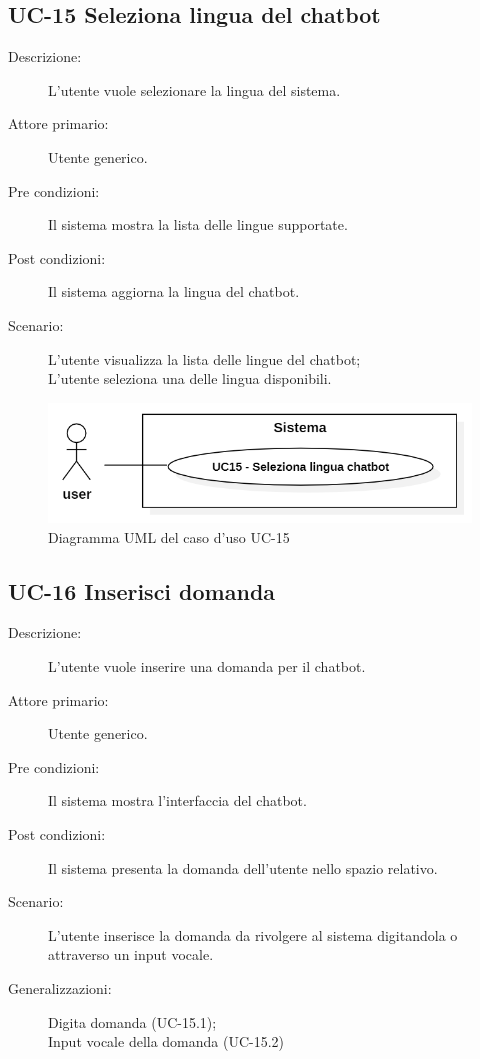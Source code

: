 \subsection{UC-15 Seleziona lingua del chatbot}
\begin{description}
    \item[Descrizione:] L'utente vuole selezionare la lingua del sistema.
    \item[Attore primario:] Utente generico.
    \item[Pre condizioni:] Il sistema mostra la lista delle lingue supportate.
    \item[Post condizioni:] Il sistema aggiorna la lingua del chatbot.
    \item[Scenario:] L'utente visualizza la lista delle lingue del chatbot;\\L'utente seleziona una delle lingua disponibili.
\end{description}

\begin{figure}[H]
    \centering
    \includegraphics[width=0.8\linewidth]{UC15.png}
    \caption{Diagramma UML del caso d'uso UC-15}
    \label{fig:UC15}
\end{figure}

\subsection{UC-16 Inserisci domanda}
\begin{description}
    \item[Descrizione:] L'utente vuole inserire una domanda per il chatbot.
    \item[Attore primario:] Utente generico.
    \item[Pre condizioni:] Il sistema mostra l'interfaccia del chatbot.
    \item[Post condizioni:] Il sistema presenta la domanda dell'utente nello spazio relativo.
    \item[Scenario:] L'utente inserisce la domanda da rivolgere al sistema digitandola o attraverso un input vocale.
    \item[Generalizzazioni:] Digita domanda (UC-15.1);\\Input vocale della domanda (UC-15.2) 
\end{description}

